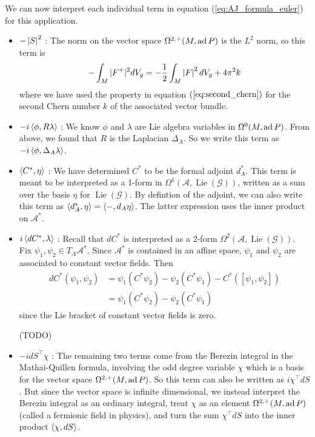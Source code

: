 We can now interpret each individual term in equation (\ref{eq:AJ_formula_euler})
for this application. 
\begin{itemize}[leftmargin=\parindent]
    \item 
$-\abs{S}^2$ : The norm on the vector space $\Omega^{2,+}(M,\operatorname{ad} P)$ is the 
$L^2$ norm, so this term is 
\[
	-\int_M \abs[*]{F^+}^2 dV_g = -\frac{1}{2}\int_M \abs{F}^2 dV_g + 4\pi^2k
\] 
where we have used the property in equation $(\ref{eq:second_chern})$ for the 
second Chern number $k$ of the associated vector bundle.

	\item 
$-i\gen{\phi,R\lambda}$ : We know $\phi$ and  $\lambda$ are Lie algebra
variables in  $\Omega^0(M,\operatorname{ad} P)$. From above, we found that  $R$ is the
Laplacian $\Delta_A$. So we write this term as  
$-i\gen{\phi,\Delta_A\lambda}$. 

	\item 
$\gen{C^*,\eta}$ : We have determined $C^*$ to be the formal adjoint $d_A^*$. 
This term is meant to be interpreted as a 1-form in
$\Omega^1(\mathcal{A},\operatorname{Lie}(\mathcal{G}))$, written as a sum over
the basis $\eta$ for $\operatorname{Lie}(\mathcal{G})$. By defintion of the
adjoint, we can also write this term as $\gen{d_A^*,\eta}=\gen{-,d_A\eta}$. 
The latter expression uses the inner product on $\mathcal{A}^*$. 

	\item 
$i\gen{dC^*,\lambda}$ : Recall that $dC^*$ is interpreted as a 2-form 
$\Omega^2(\mathcal{A},\operatorname{Lie}(\mathcal{G}))$. Fix $\psi_1,\psi_2\in
T_A \mathcal{A}^*$. Since $\mathcal{A}^*$ is contained in an affine space, 
$\psi_1$ and $\psi_2$ are associated to constant vector fields. Then 
\begin{align*}
	dC^*(\psi_1,\psi_2) 
	&= \psi_1(C^*\psi_2) - \psi_2(C^*\psi_1) - C^*([\psi_1,\psi_2]) \\
	&= \psi_1(C^*\psi_2) - \psi_2(C^*\psi_1) 
\end{align*}
since the Lie bracket of constant vector fields is zero. 

(TODO)


	\item 
$-idS^\intercal \chi$ : The remaining two terms come from the Berezin integral
in the Mathai-Quillen formula, involving the odd degree
variable $\chi$ which is a basis for the vector space $\Omega^{2,+}(M,\operatorname{ad} P)$.
So this term can also be written as $i \chi^{\intercal} dS$.
But since the vector space is infinite dimensional, we instead interpret the Berezin
integral as an ordinary integral, treat $\chi$ as an element 
$\Omega^{2,+}(M,\operatorname{ad} P)$ (called a fermionic field in physics), and turn the 
sum $\chi^\intercal dS$ into the inner product $\gen{\chi,dS}$.


\end{itemize}
